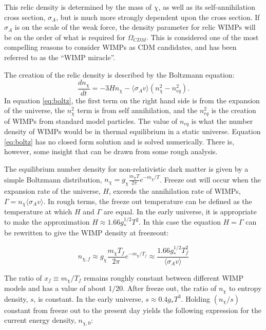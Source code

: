 This relic density is determined by the mass of $\chi$, as well as its self-annihilation cross section, $\sigma_{A}$, but is much more strongly dependent upon the cross section.\cite{susyDM,wimp2} If $\sigma_{A}$ is on the scale of the weak force, the density parameter for relic WIMPs will be on the order of what is required for $\Omega_{CDM}$. This is considered one of the most compelling reasons to consider WIMPs as CDM candidates, and has been referred to as the ``WIMP miracle''\cite{wimp1,wimp2, susyDM}.

The creation of the relic density is described by the Boltzmann equation:
\begin{equation}\label{eq:boltz}
\frac{dn_{\chi}}{dt} = -3Hn_{\chi}- \langle \sigma_{A}v \rangle (n_{\chi}^{2}-n_{eq}^{2}).
\end{equation}
In equation \ref{eq:boltz}, the first term on the right hand side is from the expansion of the universe, the $n_{\chi}^{2}$ term is from self annihilation, and the $n_{eq}^{2}$ is the creation of WIMPs from standard model particles.\cite{susyDM,wimp2} The value of $n_{eq}$ is what the number density of WIMPs would be in thermal equilibrium in a static universe. Equation \ref{eq:boltz} has no closed form solution and is solved numerically. There is, however, some insight that can be drawn from some rough analysis\cite{wimp1,wimp2}.

The equilibrium number density for non-relativistic dark matter is given by a simple Boltzmann distribution, $n_{\chi}=g_{\chi}\frac{m_{\chi} T}{2 \pi}e^{-m_{\chi}/T}$.\cite{wimp1} Freeze out will occur when the expansion rate of the universe, $H$, exceeds the annihilation rate of WIMPs, $\Gamma =  n_{\chi} \langle \sigma_{A}v \rangle $. In rough terms, the freeze out temperature can be defined as the temperature at  which $H$ and $\Gamma$ are equal.\cite{wimp1,wimp2}  In the early universe, it is appropriate to make the approximation $H \approx 1.66 g_{*}^{1/2}T^{2}$\cite{susyDM}. In this case the equation $H=\Gamma$ can be rewritten to give the WIMP density at freezeout:

\begin{equation}\label{eq}
n_{\chi,f}
\approx
g_{\chi}\frac{m_{\chi} T_{f}}{2 \pi}e^{-m_{\chi}/T_{f}} 
\approx 
\frac{1.66 g_{*}^{1/2}T_{f}^{2}}{\langle \sigma_{A}v \rangle }
\end{equation}

The ratio of $x_{f} \equiv m_{\chi}/T_{f}$ remains roughly constant between different WIMP models and has a value of about $1/20$. After freeze out, the ratio of $n_{\chi}$ to entropy density, $s$, is constant. In the early universe, $s \approx 0.4 g_{*}T^{3}$. Holding $(n_{\chi}/s)$ constant from freeze out to the present day yields the following expression for the current energy density, $n_{\chi,0}$:

